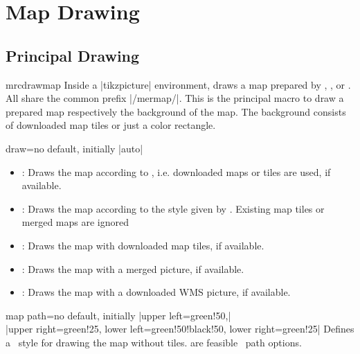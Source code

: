 \clearpage
\section{Map Drawing}

\subsection{Principal Drawing}

\begin{docCommand}{mrcdrawmap}{}
  Inside a |tikzpicture| environment,  draws a map
  prepared by , , or .
  All  share the common prefix |/mermap/|.
  This is the principal macro to draw a prepared map respectively
  the background of the map. The background consists of downloaded map tiles
  or just a color rectangle.
\end{docCommand}

\begin{docMrcKey}{draw}{=}{no default, initially |auto|}
  \begin{itemize}
  \item{}: Draws the map according to ,
    i.e. downloaded maps or tiles are used, if available.
  \item{}: Draws the map according to the style given by
    . Existing map tiles or merged maps are ignored
  \item{}: Draws the map with downloaded map tiles, if
    available.
  \item{}: Draws the map with a merged picture, if
    available.
  \item{}: Draws the map with a downloaded WMS picture, if
    available.
  \end{itemize}
\end{docMrcKey}

\begin{docMrcKey}{map path}{=}{no default, initially |upper left=green!50,|\\|upper right=green!25, lower left=green!50!black!50, lower right=green!25|}
  Defines a \tikzname\ style for drawing the map without tiles.
   are feasible \tikzname\ path options.
\end{docMrcKey}

